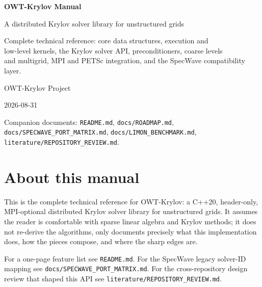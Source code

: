 \documentclass[11pt,a4paper]{report}
\begin{document}
\begin{titlepage}
\centering
\vspace*{2.5cm}
{\Huge\bfseries OWT-Krylov Manual\par}
\vspace{0.6cm}
{\Large A distributed Krylov solver library for unstructured grids\par}
\vspace{1.6cm}
{\large Complete technical reference: core data structures, execution and\\
low-level kernels, the Krylov solver API, preconditioners, coarse levels\\
and multigrid, MPI and PETSc integration, and the SpecWave compatibility\\
layer.\par}
\vfill
{\large OWT-Krylov Project\par}
\vspace{0.3cm}
{\large 2026-08-31\par}
\vspace{1cm}
{\small Companion documents: \texttt{README.md},
\texttt{docs/ROADMAP.md}, \texttt{docs/SPECWAVE\_PORT\_MATRIX.md},
\texttt{docs/LIMON\_BENCHMARK.md}, \texttt{literature/REPOSITORY\_REVIEW.md}.\par}
\end{titlepage}

\tableofcontents

\chapter*{About this manual}

This is the complete technical reference for OWT-Krylov: a C++20,
header-only, MPI-optional distributed Krylov solver library for
unstructured grids. It assumes the reader is comfortable with sparse
linear algebra and Krylov methods; it does not re-derive the algorithms,
only documents precisely what this implementation does, how the pieces
compose, and where the sharp edges are.

For a one-page feature list see \texttt{README.md}. For the SpecWave
legacy solver-ID mapping see \texttt{docs/SPECWAVE\_PORT\_MATRIX.md}. For
the cross-repository design review that shaped this API see
\texttt{literature/REPOSITORY\_REVIEW.md}.
\end{document}
